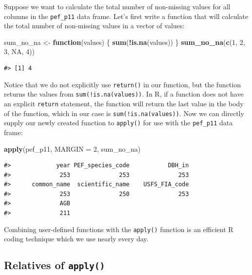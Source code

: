 \documentclass[
  11pt,
]{krantz}
\newenvironment{Shaded}{\begin{snugshade}}{\end{snugshade}}
\newcommand{\ControlFlowTok}[1]{\textcolor[rgb]{0.13,0.29,0.53}{\textbf{#1}}}
\newcommand{\DataTypeTok}[1]{\textcolor[rgb]{0.13,0.29,0.53}{#1}}
\newcommand{\DecValTok}[1]{\textcolor[rgb]{0.00,0.00,0.81}{#1}}
\newcommand{\KeywordTok}[1]{\textcolor[rgb]{0.13,0.29,0.53}{\textbf{#1}}}
\newcommand{\NormalTok}[1]{#1}
\newcommand{\OperatorTok}[1]{\textcolor[rgb]{0.81,0.36,0.00}{\textbf{#1}}}
\newcommand{\OtherTok}[1]{\textcolor[rgb]{0.56,0.35,0.01}{#1}}
\newcommand{\StringTok}[1]{\textcolor[rgb]{0.31,0.60,0.02}{#1}}
\theoremstyle{definition}
\theoremstyle{definition}
\theoremstyle{definition}
\theoremstyle{definition}
\theoremstyle{remark}
\begin{document}
Suppose we want to calculate the total number of non-missing values for all columns in the \texttt{pef\_p11} data frame. Let's first write a function that will calculate the total number of non-missing values in a vector of values:

\begin{Shaded}
\begin{Highlighting}[]
\NormalTok{sum\_no\_na \textless{}{-}}\StringTok{ }\ControlFlowTok{function}\NormalTok{(values) \{}
   \KeywordTok{sum}\NormalTok{(}\OperatorTok{!}\KeywordTok{is.na}\NormalTok{(values))}
\NormalTok{\}}
\KeywordTok{sum\_no\_na}\NormalTok{(}\KeywordTok{c}\NormalTok{(}\DecValTok{1}\NormalTok{, }\DecValTok{2}\NormalTok{, }\DecValTok{3}\NormalTok{, }\OtherTok{NA}\NormalTok{, }\DecValTok{4}\NormalTok{))}
\end{Highlighting}
\end{Shaded}

\begin{verbatim}
#> [1] 4
\end{verbatim}

Notice that we do not explicitly use \texttt{return()} in our function, but the function returns the values from \texttt{sum(!is.na(values))}. In R, if a function does not have an explicit \texttt{return} statement, the function will return the last value in the body of the function, which in our case is \texttt{sum(!is.na(values))}. Now we can directly supply our newly created function to \texttt{apply()} for use with the \texttt{pef\_p11} data frame:

\begin{Shaded}
\begin{Highlighting}[]
\KeywordTok{apply}\NormalTok{(pef\_p11, }\DataTypeTok{MARGIN =} \DecValTok{2}\NormalTok{, sum\_no\_na)}
\end{Highlighting}
\end{Shaded}

\begin{verbatim}
#>             year PEF_species_code           DBH_in 
#>              253              253              253 
#>      common_name  scientific_name    USFS_FIA_code 
#>              253              250              253 
#>              AGB 
#>              211
\end{verbatim}

Combining user-defined functions with the \texttt{apply()} function is an efficient R coding technique which we use nearly every day.

\hypertarget{relatives-of-apply}{%
\subsection{\texorpdfstring{Relatives of \texttt{apply()}}{Relatives of apply()}}\label{relatives-of-apply}}
\end{document}
